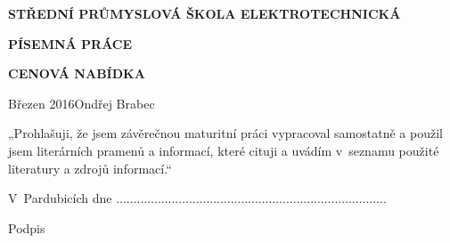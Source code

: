 \begin{titlepage}
	\begin{center}

	{\Large{}\vspace{1.5cm}}
	
	{\Large\textbf{STŘEDNÍ PRŮMYSLOVÁ ŠKOLA ELEKTROTECHNICKÁ}\vspace{4cm}}


	{\Large \bfseries PÍSEMNÁ PRÁCE\par \vspace{0.5cm}}
	{\Large \bfseries CENOVÁ NABÍDKA}
	\vfill
	\end{center}
	\begin{flushleft}
	Březen 2016\hfill Ondřej Brabec
	\end{flushleft}
	

\end{titlepage}
\newpage
\pagestyle{empty}
\null
\vfill
\begin{textit}
	{„Prohlašuji, že jsem závěrečnou maturitní práci vypracoval samostatně a použil jsem literárních pramenů a informací, které cituji a uvádím v seznamu použité literatury a zdrojů informací.“\par}
	\vspace{1.5cm}
	\begin{flushleft}
	{V~Pardubicích dne ..............................\hfill................................................\par}
	\end{flushleft}
	\begin{flushright}
	{Podpis\hspace{2cm}\null}
	\end{flushright}
\end{textit}
\newpage
\null
\newpage